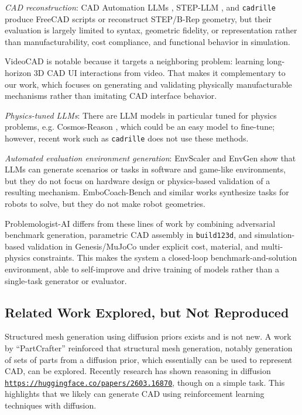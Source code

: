 \documentclass[conference]{IEEEtran}
\begin{document}
\textit{CAD reconstruction}: CAD Automation LLMs \cite{ref31}, STEP-LLM \cite{ref32}, and \texttt{cadrille} \cite{ref39} produce FreeCAD scripts or reconstruct STEP/B-Rep geometry, but their evaluation is largely limited to syntax, geometric fidelity, or representation rather than manufacturability, cost compliance, and functional behavior in simulation.

VideoCAD \cite{ref41} is notable because it targets a neighboring problem: learning long-horizon 3D CAD UI interactions from video. That makes it complementary to our work, which focuses on generating and validating physically manufacturable mechanisms rather than imitating CAD interface behavior.

\textit{Physics-tuned LLMs}: There are LLM models in particular tuned for physics problems, e.g. Cosmos-Reason \cite{ref33}, which could be an easy model to fine-tune; however, recent work such as \texttt{cadrille} does not use these methods.

\textit{Automated evaluation environment generation}: EnvScaler \cite{ref29} and EnvGen \cite{ref30} show that LLMs can generate scenarios or tasks in software and game-like environments, but they do not focus on hardware design or physics-based validation of a resulting mechanism. EmboCoach-Bench \cite{ref28} and similar works synthesize tasks for robots to solve, but they do not make robot geometries.

Problemologist-AI differs from these lines of work by combining adversarial benchmark generation, parametric CAD assembly in \texttt{build123d}, and simulation-based validation in Genesis/MuJoCo under explicit cost, material, and multi-physics constraints. This makes the system a closed-loop benchmark-and-solution environment, able to self-improve and drive training of models rather than a single-task generator or evaluator.

\subsection{Related Work Explored, but Not Reproduced}
Structured mesh generation using diffusion priors exists and is not new. A work by ``PartCrafter'' reinforced that structural mesh generation, notably generation of sets of parts from a diffusion prior, which essentially can be used to represent CAD, can be explored. Recently research has shown reasoning in diffusion \href{https://huggingface.co/papers/2603.16870}{\nolinkurl{https://huggingface.co/papers/2603.16870}}, though on a simple task. This highlights that we likely can generate CAD using reinforcement learning techniques with diffusion.
\end{document}
